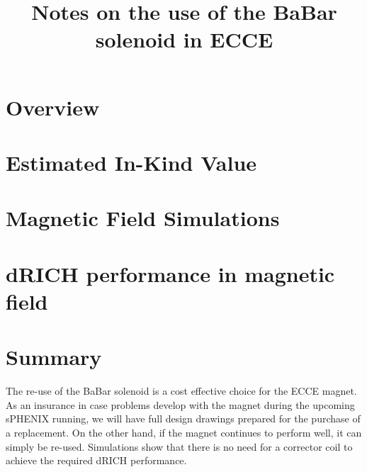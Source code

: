 \documentclass[12pt,twoside]{article}
\title{Notes on the use of the BaBar solenoid in ECCE}
\begin{document}
\pagestyle{empty}


\cleardoublepage
\pagestyle{plain}
\maketitle
{}


\begin{abstract}
\label{sec:ExecutiveSummary}

\end{abstract}

\clearpage
\setcounter{tocdepth}{3}
\tableofcontents
\clearpage
{}
\setcounter{page}{1}


\section {Overview}
\label{overview}
 

\section {Estimated In-Kind Value}
\label{costing}


\section {Magnetic Field Simulations}
\label{simulations}


\section {dRICH performance in magnetic field}
\label{dRICH}


\listoftodos[To Do]

\section{Summary}
\label{summary}
The re-use of the BaBar solenoid is a cost effective choice for the ECCE magnet.   As an insurance in case problems develop with the magnet during the upcoming sPHENIX running, we will have full design drawings prepared for the purchase of a replacement.   On the other hand, if the magnet continues to perform well, it can simply be re-used. Simulations show that there is no need for a corrector coil to achieve the required dRICH performance.  




\end{document}
